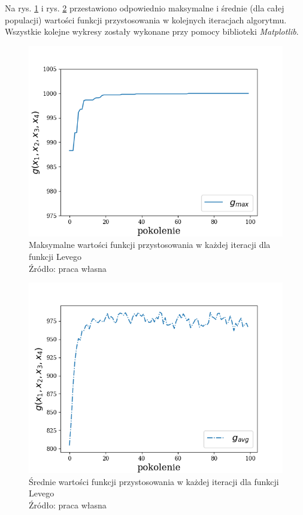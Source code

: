 Na rys. \ref{fig:levy_maxes} i rys. \ref{fig:levy_means} przestawiono odpowiednio maksymalne i średnie (dla całej populacji) wartości funkcji przystosowania w kolejnych iteracjach algorytmu.
Wszystkie kolejne wykresy zostały wykonane przy pomocy biblioteki \textit{Matplotlib}. \cite{Hunter:2007}

\begin{figure}[h!tb]
	 \centering
	 \includegraphics[width = 0.85\linewidth]{img/levy_maxes}
	 \caption{Maksymalne wartości funkcji przystosowania w każdej iteracji dla funkcji Levego \\
              Źródło: praca własna}
	 \label{fig:levy_maxes}
\end{figure}

\begin{figure}[h!tb]
	 \centering
	 \includegraphics[width = 0.85\linewidth]{img/levy_means}
	 \caption{Średnie wartości funkcji przystosowania w każdej iteracji dla funkcji Levego \\
              Źródło: praca własna}
	 \label{fig:levy_means}
\end{figure}

